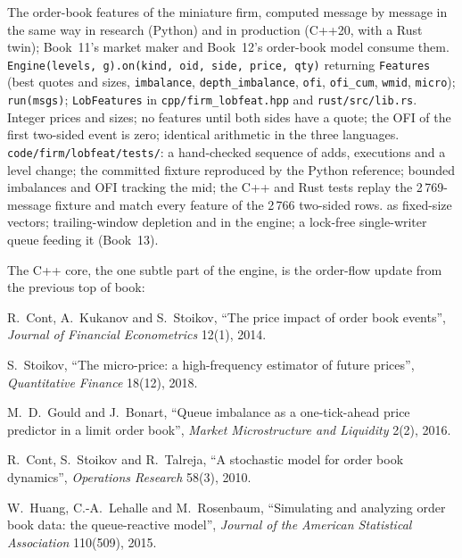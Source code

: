 \begin{build}
 The order-book features of the miniature firm, computed message by message in the same way in research (Python) and in
production (C++20, with a Rust twin); Book~11's market maker and Book~12's order-book model consume them.
 \texttt{Engine(levels, g).on(kind, oid, side, price, qty)} returning \texttt{Features} (best quotes and sizes,
\texttt{imbalance}, \texttt{depth\_imbalance}, \texttt{ofi}, \texttt{ofi\_cum}, \texttt{wmid}, \texttt{micro}); \texttt{run(msgs)};
\texttt{LobFeatures} in \texttt{cpp/firm\_lobfeat.hpp} and \texttt{rust/src/lib.rs}.
 Integer prices and sizes; no features until both sides have a quote; the OFI of the first two-sided event is zero; identical
arithmetic in the three languages.
 \texttt{code/firm/lobfeat/tests/}: a hand-checked sequence of adds, executions and a level change; the committed
fixture reproduced by the Python reference; bounded imbalances and OFI tracking the mid; the C++ and Rust tests replay the 2\,769-message
fixture and match every feature of the 2\,766 two-sided rows.
  as fixed-size vectors; trailing-window depletion and  in the engine; a lock-free
single-writer queue feeding it (Book~13).
\end{build}

The C++ core, the one subtle part of the engine, is the order-flow update from the previous top of book:

\label{lst:rs:order-book-features:cpp}

\begin{omsources}
\item R.~Cont, A.~Kukanov and S.~Stoikov, ``The price impact of order book events'', \emph{Journal of Financial Econometrics} 12(1), 2014.
\item S.~Stoikov, ``The micro-price: a high-frequency estimator of future prices'', \emph{Quantitative Finance} 18(12), 2018.
\item M.~D.~Gould and J.~Bonart, ``Queue imbalance as a one-tick-ahead price predictor in a limit order book'', \emph{Market Microstructure
and Liquidity} 2(2), 2016.
\item R.~Cont, S.~Stoikov and R.~Talreja, ``A stochastic model for order book dynamics'', \emph{Operations Research} 58(3), 2010.
\item W.~Huang, C.-A.~Lehalle and M.~Rosenbaum, ``Simulating and analyzing order book data: the queue-reactive model'', \emph{Journal of the
American Statistical Association} 110(509), 2015.
\end{omsources}

